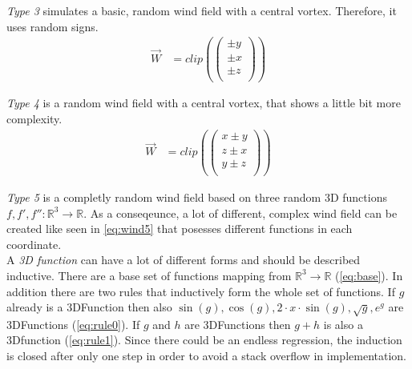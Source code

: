 \emph{Type 3} simulates a basic, random wind field with a central vortex. Therefore, it uses random signs.
\begin{align}
	\overrightarrow{W} &= clip(\left(
	\begin{array}{c}
		\pm y\\
		\pm x\\
		\pm z\\
	\end{array}
	\right))
\end{align}
\newline

\emph{Type 4} is a random wind field with a central vortex, that shows a little bit more complexity.
\begin{align}
	\overrightarrow{W} &= clip(\left(
	\begin{array}{c}
		x \pm y\\
		z \pm x\\
		y \pm z\\
	\end{array}
	\right))
\end{align}
\newline

\emph{Type 5} is a completly random wind field based on three random 3D functions $f, f', f'': \mathbb{R}^3 \to \mathbb{R}$. As a conseqeunce, a lot of different, complex wind field can be created like seen in \cref{eq:wind5} that posesses different functions in each coordinate.\\

A \emph{3D function} can have a lot of different forms and should be described inductive. There are a base set of functions mapping from $\mathbb{R}^3 \to \mathbb{R}$ (\cref{eq:base}). In addition there are two rules that inductively form the whole set of functions. If $g$ already is a 3DFunction then also $\sin(g), \cos(g), 2 \cdot x \cdot \sin(g), \sqrt{g}, e^g$ are 3DFunctions (\cref{eq:rule0}). If $g$ and $h$ are 3DFunctions then $g+h$ is also a 3Dfunction (\cref{eq:rule1}). Since there could be an endless regression, the induction is closed after only one step in order to avoid a stack overflow in implementation. 

